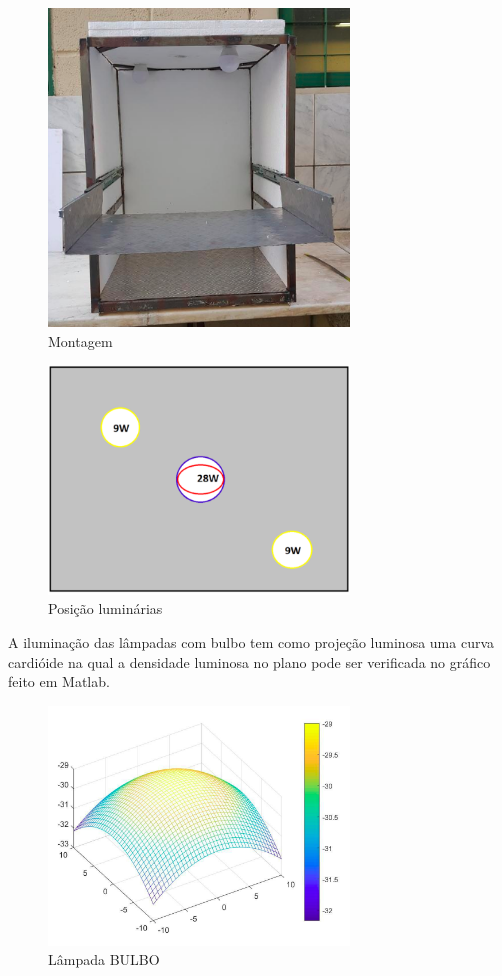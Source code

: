 \begin{figure}[H]
	\centering
	\includegraphics[width=8cm]{figuras/montagem.png}
	\caption{Montagem}
	\label{montagem}
\end{figure}

\begin{figure}[H]
	\centering
	\includegraphics[width=8cm]{figuras/posicao_luminarias.png}
	\caption{Posição luminárias}
	\label{posicao_luminarias}
\end{figure}

A iluminação das lâmpadas com bulbo tem como projeção luminosa uma curva cardióide na qual a densidade luminosa no plano pode ser verificada no gráfico feito em Matlab.

\begin{figure}[H]
	\centering
	\includegraphics[width=8cm]{figuras/bulbo.png}
	\caption{Lâmpada BULBO}
	\label{bulbo}
\end{figure}
